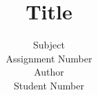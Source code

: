 \documentclass[12pt, a4paper]{article}
\title{Title\vspace{-2ex}}
\author{Subject\\Assignment Number\\Author\\Student Number}
\date{\vspace{-5ex}}
\begin{document}
\maketitle
\begin{spacing}{1.5}



\printbibliography
\end{spacing}
\end{document}
